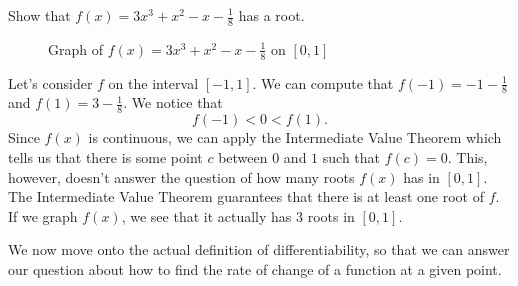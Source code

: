 \begin{exmp}
Show that $f(x)=3x^3+x^2-x-\frac{1}{8}$ has a root.\\

\begin{figure}
  \centering
  \caption{Graph of $f(x)=3x^3+x^2-x-\frac{1}{8}$ on $[0,1]$}
\end{figure}

Let's consider $f$ on the interval $[-1,1]$. We can compute that $f(-1)=-1-\frac{1}{8}$ and $f(1)=3-\frac{1}{8}$. We notice that
\[
f(-1)<0<f(1).
\] Since $f(x)$ is continuous, we can apply the Intermediate Value Theorem which tells us that there is some point $c$ between $0$ and $1$ such that $f(c)=0$. This, however, doesn't answer the question of how many roots $f(x)$ has in $[0,1]$. The Intermediate Value Theorem guarantees that there is at least one root of $f$. If we graph $f(x)$, we see that it actually has 3 roots in $[0,1]$.
\end{exmp}









We now move onto the actual definition of differentiability, so that we can answer our question about how to find the rate of change of a function at a given point.
